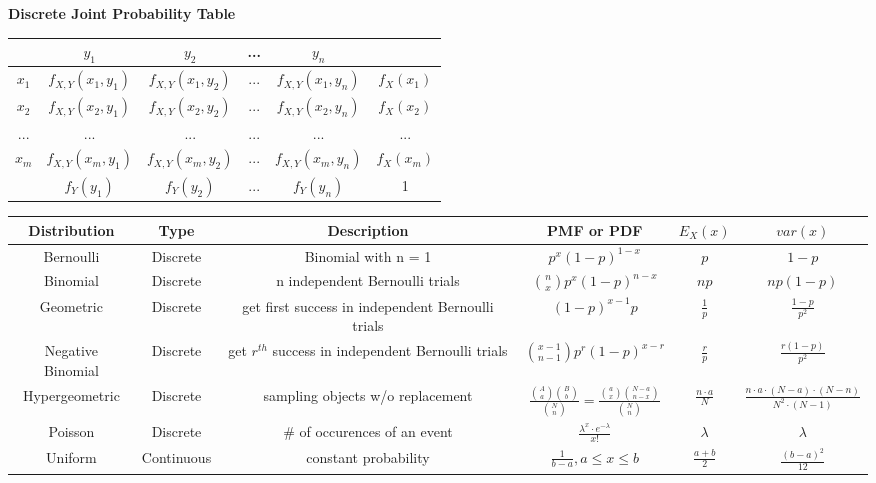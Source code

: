 \documentclass{article}
\begin{document}
\begin{small}
\begin{multicols}{2}
\begin{enumerate}
\end{enumerate}

\textbf{Discrete Joint Probability Table}
\center\begin{tabular}{ |c|c|c|c|c|c| }
\hline
& $y_1$ & $y_2$ & ... & $y_n$ & \\
\hline
$x_1$ & $f_{X,Y}(x_1, y_1)$ &  $f_{X,Y}(x_1, y_2)$ & ... & $f_{X,Y}(x_1, y_n)$ & $f_X(x_1)$\\
\hline
$x_2$ & $f_{X,Y}(x_2, y_1)$ &  $f_{X,Y}(x_2, y_2)$ & ... & $f_{X,Y}(x_2, y_n)$ & $f_X(x_2)$\\
\hline
...   & ...                 &  ...                 & ... & ...                 & ... \\
\hline
$x_m$ & $f_{X,Y}(x_m, y_1)$ &  $f_{X,Y}(x_m, y_2)$ & ... & $f_{X,Y}(x_m, y_n)$ & $f_X(x_m)$\\
\hline
      & $f_Y(y_1)$    &  $f_Y(y_2)$    & ... & $f_Y(y_n)$    & 1\\
\hline
\end{tabular}

\end{multicols}

\pagebreak


\center\begin{tabular}{ |c|c|c|c|c|c| }
\hline 
Distribution & Type & Description & PMF or PDF & $E_X(x)$ & $var(x)$ \\
\hline
Bernoulli & Discrete & Binomial with n = 1 & $ p^{x}(1-p)^{1-x}$ & $p$ & $1 - p$ \\
\hline
Binomial & Discrete & n independent Bernoulli trials & $\binom{n}{x}p^{x}(1-p)^{n-x}$ & $np$ & $np(1 - p)$ \\
\hline
Geometric & Discrete & get first success in independent Bernoulli trials & $(1 - p)^{x - 1}p$ & $\frac{1}{p}$ & $\frac{1 - p}{p^2}$ \\
\hline
Negative Binomial & Discrete & get $r^{th}$ success in independent Bernoulli trials & $\binom{x - 1}{n - 1}p^{r}(1 - p)^{x - r}$ & $\frac{r}{p}$ & $\frac{r(1 - p)}{p^2}$ \\
\hline
Hypergeometric & Discrete & sampling objects w/o replacement & $\frac{\binom{A}{a}\binom{B}{b}}{\binom{N}{n}} = \frac{\binom{a}{x}\binom{N-a}{n-x}}{\binom{N}{n}}$ & $\frac{n \cdot a}{N}$ & $\frac{n \cdot a \cdot (N - a) \cdot (N - n)}{N^2 \cdot (N - 1)}$\\
\hline
Poisson & Discrete & \# of occurences of an event & $\frac{\lambda^x \cdot e^{-\lambda}}{x!}$ & $\lambda$ & $\lambda$\\
\hline
\hline
Uniform & Continuous & constant probability & $\frac{1}{b - a}, a \le x \le b$ & $\frac{a + b}{2}$ & $\frac{(b-a)^2}{12}$\\
\hline
\end{tabular}


\end{small}
\end{document}
